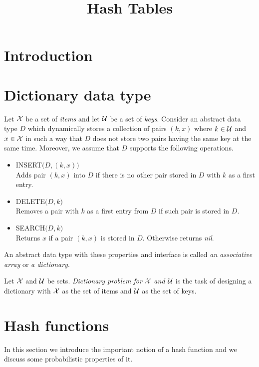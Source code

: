 


\title{Hash Tables}
\date{}
\maketitle

\section{Introduction}

\section{Dictionary data type}

\begin{definition}
Let ${\mathcal X}$ be a set of \textit{items} and let ${\mathcal U}$ be a set of \textit{keys}. Consider an abstract data type $D$ which dynamically stores a collection of pairs $(k, x)$ where $k\in {\mathcal U}$ and $x\in {\mathcal X}$ in such a way that $D$ does not store two pairs having the same key at the same time. Moreover, we assume that $D$ supports the following operations.
\begin{itemize}
\item[] \textrm{INSERT}$\big(D,(k,x)\big)$\\
Adds pair $(k,x)$ into $D$ if there is no other pair stored in $D$ with $k$ as a first entry.
\item[] \textrm{DELETE}$\big(D,k\big)$\\
Removes a pair with $k$ as a first entry from $D$ if such pair is stored in $D$.
\item[] \textrm{SEARCH}$\big(D,k\big)$\\
Returns $x$ if a pair $(k,x)$ is stored in $D$. Otherwise returns \textit{nil}. 
\end{itemize}
An abstract data type with these properties and interface is called \textit{an associative array} or \textit{a dictionary}.
\end{definition}

\begin{definition}
Let ${\mathcal X}$ and ${\mathcal U}$ be sets. \textit{Dictionary problem for ${\mathcal X}$ and ${\mathcal U}$} is the task of designing a dictionary with ${\mathcal X}$ as the set of items and ${\mathcal U}$ as the set of keys.
\end{definition}

\section{Hash functions}
\noindent
In this section we introduce the important notion of a hash function and we discuss some probabilistic properties of it.

